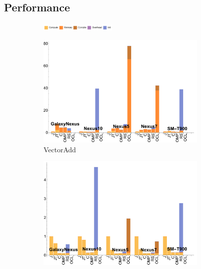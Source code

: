 \subsection{Performance}

\begin{figure}
  \centering
  \begin{subfigure}[b]{\textwidth}
          \centering
          \includegraphics[width=0.4\textwidth]{data/legend.pdf}
  \end{subfigure}

  \begin{subfigure}[b]{0.33\textwidth}
      \centering
      \includegraphics[width=0.9\textwidth]{data/VectorAdd_onecompute_time.pdf}
      \caption{VectorAdd}
  \end{subfigure}
  \begin{subfigure}[b]{0.33\textwidth}
      \centering
      \includegraphics[width=0.9\textwidth]{data/Sgemm_onecompute_time.pdf}

\end{subfigure}
\end{figure}

